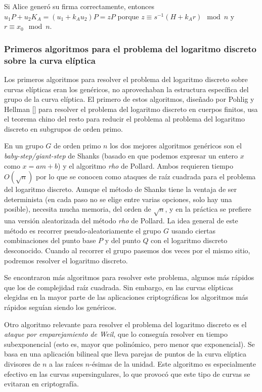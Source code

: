 \documentclass[
  a4paper,
  12pt,
  spanish,
]{scrartcl}
\begin{document}
Si Alice generó su firma correctamente, entonces $u_1P+u_2K_A=(u_1+k_Au_2)P=zP$ porque $z \equiv s^{-1}(H+k_Ar) \mod n$ y $r \equiv x_0 \mod n$.

\subsubsection{Primeros algoritmos para el problema del logaritmo discreto sobre la curva elíptica} %

Los primeros algoritmos para resolver el problema del logaritmo discreto sobre curvas elípticas eran los genéricos, no aprovechaban la estructura específica del grupo de la curva elíptica. El primero de estos algoritmos, diseñado por Pohlig y Hellman [] para resolver el problema del logaritmo discreto en cuerpos finitos, usa el teorema chino del resto para reducir el problema al problema del logaritmo discreto en subgrupos de orden primo.

En un grupo $G$ de orden primo $n$ los dos mejores algoritmos genéricos son el \textit{baby-step/giant-step} de Shanks (basado en que podemos expresar un entero $x$ como $x = am + b$) y el algoritmo \textit{rho} de Pollard. Ambos requieren tiempo $O(\sqrt{n})$ por lo que se conocen como ataques de raíz cuadrada para el problema del logaritmo discreto. Aunque el método de Shanks tiene la ventaja de ser determinista (en cada paso no se elige entre varias opciones, solo hay una posible), necesita mucha memoria, del orden de $\sqrt{n}$, y en la práctica se prefiere una versión aleatorizada del método \textit{rho} de Pollard. La idea general de este método es recorrer pseudo-aleatoriamente el grupo $G$ usando ciertas combinaciones del punto base $P$ y del punto $Q$ con el logaritmo discreto desconocido. Cuando al recorrer el grupo pasemos dos veces por el mismo sitio, podremos resolver el logaritmo discreto.

Se encontraron más algoritmos para resolver este problema, algunos más rápidos que los de complejidad raíz cuadrada. Sin embargo, en las curvas elípticas elegidas en la mayor parte de las aplicaciones criptográficas los algoritmos más rápidos seguían siendo los genéricos.

Otro algoritmo relevante para resolver el problema del logaritmo discreto es el \textit{ataque por emparejamiento de Weil}, que lo conseguía resolver en tiempo subexponencial (esto es, mayor que polinómico, pero menor que exponencial). Se basa en una aplicación bilineal que lleva parejas de puntos de la curva elíptica divisores de $n$ a las raíces $n$-ésimas de la unidad. Este algoritmo es especialmente efectivo en las curvas supersingulares, lo que provocó que este tipo de curvas se evitaran en criptografía.
\end{document}
